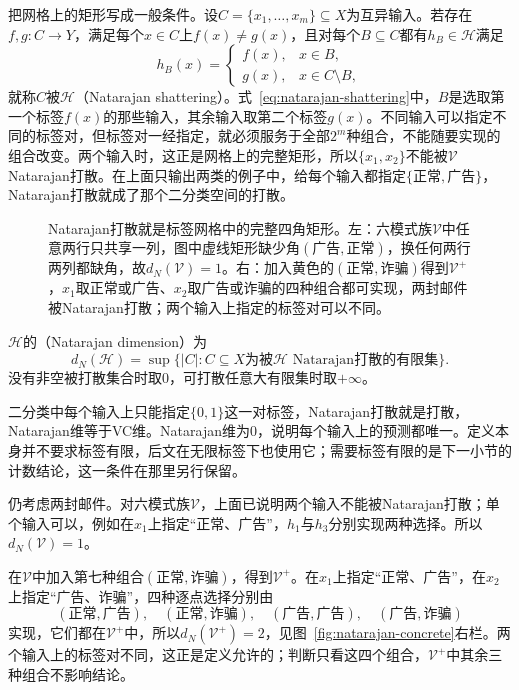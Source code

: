 把网格上的矩形写成一般条件。设$C=\{x_1,\ldots,x_m\}\subseteq X$为互异输入。若存在$f,g:C\to Y$，满足每个$x\in C$上$f(x)\neq g(x)$，且对每个$B\subseteq C$都有$h_B\in\mathcal H$满足
\begin{equation}
 h_B(x)=\begin{cases}f(x),&x\in B,\\g(x),&x\in C\setminus B,\end{cases}
 \label{eq:natarajan-shattering}
\end{equation}
就称$C$被$\mathcal H$（Natarajan shattering）。式~\eqref{eq:natarajan-shattering}中，$B$是选取第一个标签$f(x)$的那些输入，其余输入取第二个标签$g(x)$。不同输入可以指定不同的标签对，但标签对一经指定，就必须服务于全部$2^m$种组合，不能随要实现的组合改变。两个输入时，这正是网格上的完整矩形，所以$\{x_1,x_2\}$不能被$\mathcal V$ Natarajan打散。在上面只输出两类的例子中，给每个输入都指定$\{\text{正常},\text{广告}\}$，Natarajan打散就成了那个二分类空间的打散。

\begin{figure}[htbp]
  \centering
  
  \caption{Natarajan打散就是标签网格中的完整四角矩形。左：六模式族$\mathcal V$中任意两行只共享一列，图中虚线矩形缺少角$(\text{广告},\text{正常})$，换任何两行两列都缺角，故$d_N(\mathcal V)=1$。右：加入黄色的$(\text{正常},\text{诈骗})$得到$\mathcal V^+$，$x_1$取正常或广告、$x_2$取广告或诈骗的四种组合都可实现，两封邮件被Natarajan打散；两个输入上指定的标签对可以不同。}
  \label{fig:natarajan-concrete}
  \label{fig:lt6-natarajan-rectangle}
\end{figure}

\begin{definition}[Natarajan维]
\label{def:natarajan-dimension}
$\mathcal H$的（Natarajan dimension）为
\[
 d_N(\mathcal H)=\sup\{|C|:C\subseteq X\text{为被}\mathcal H\text{ Natarajan打散的有限集}\}.
\]
没有非空被打散集合时取$0$，可打散任意大有限集时取$+\infty$。
\end{definition}

二分类中每个输入上只能指定$\{0,1\}$这一对标签，Natarajan打散就是打散，Natarajan维等于VC维。Natarajan维为0，说明每个输入上的预测都唯一。定义本身并不要求标签有限，后文在无限标签下也使用它；需要标签有限的是下一小节的计数结论，这一条件在那里另行保留。

\begin{example}[Natarajan维的两个对照]
\label{ex:comb-natarajan-concrete}
仍考虑两封邮件。对六模式族$\mathcal V$，上面已说明两个输入不能被Natarajan打散；单个输入可以，例如在$x_1$上指定“正常、广告”，$h_1$与$h_3$分别实现两种选择。所以$d_N(\mathcal V)=1$。

在$\mathcal V$中加入第七种组合$(\text{正常},\text{诈骗})$，得到$\mathcal V^+$。在$x_1$上指定“正常、广告”，在$x_2$上指定“广告、诈骗”，四种逐点选择分别由
\[
 (\text{正常},\text{广告}),\quad(\text{正常},\text{诈骗}),\quad
 (\text{广告},\text{广告}),\quad(\text{广告},\text{诈骗})
\]
实现，它们都在$\mathcal V^+$中，所以$d_N(\mathcal V^+)=2$，见图~\ref{fig:natarajan-concrete}右栏。两个输入上的标签对不同，这正是定义允许的；判断只看这四个组合，$\mathcal V^+$中其余三种组合不影响结论。
\end{example}

